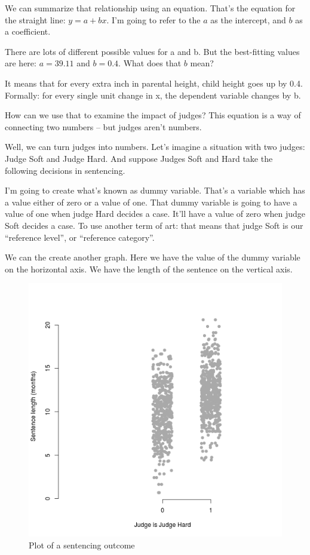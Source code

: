 \documentclass[12pt,twoside]{article}
\begin{document}
We can summarize that relationship using an equation. That's the
equation for the straight line: \(y = a + bx\). I'm going to refer to
the \(a\) as the intercept, and \(b\) as a coefficient.

There are lots of different possible values for a and b. But the
best-fitting values are here: \(a = 39.11\) and \(b = 0.4\). What does
that \(b\) mean?

It means that for every extra inch in parental height, child height goes
up by 0.4. Formally: for every single unit change in x, the dependent
variable changes by b.

How can we use that to examine the impact of judges? This equation is a
way of connecting two numbers -- but judges aren't numbers.

Well, we can turn judges into numbers. Let's imagine a situation with
two judges: Judge Soft and Judge Hard. And suppose Judges Soft and Hard
take the following decisions in sentencing.

I'm going to create what's known as dummy variable. That's a variable
which has a value either of zero or a value of one. That dummy variable
is going to have a value of one when judge Hard decides a case. It'll
have a value of zero when judge Soft decides a case. To use another term
of art: that means that judge Soft is our ``reference level'', or
``reference category''.

We can the create another graph. Here we have the value of the dummy
variable on the horizontal axis. We have the length of the sentence on
the vertical axis.

\begin{figure}[htbp]
\centering
\includegraphics{figure/fakeplot-1.png}
\caption{Plot of a sentencing outcome}
\end{figure}
\end{document}
